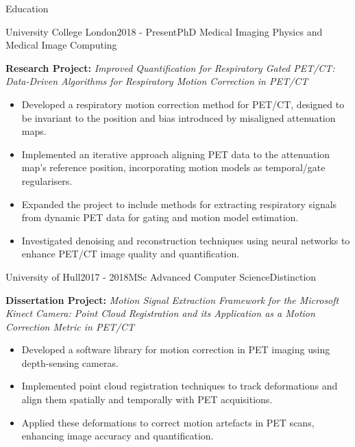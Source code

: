 \documentclass{cv}
\begin{document}
    \begin{rSection}{Education}
        \item \begin{rSubsection}{University College London}{2018 - Present}{PhD Medical Imaging Physics and Medical Image Computing}{}            
            \item \textbf{Research Project:} \textit{Improved Quantification for Respiratory Gated PET/CT: Data-Driven Algorithms for Respiratory Motion Correction in PET/CT}
            
            \item \begin{itemize}
                \item Developed a respiratory motion correction method for PET/CT, designed to be invariant to the position and bias introduced by misaligned attenuation maps.
                \item Implemented an iterative approach aligning PET data to the attenuation map’s reference position, incorporating motion models as temporal/gate regularisers.
                \item Expanded the project to include methods for extracting respiratory signals from dynamic PET data for gating and motion model estimation.
                \item Investigated denoising and reconstruction techniques using neural networks to enhance PET/CT image quality and quantification.
            \end{itemize}
        \end{rSubsection}
        
        \item \begin{rSubsection}{University of Hull}{2017 - 2018}{MSc Advanced Computer Science}{Distinction}
            \item \textbf{Dissertation Project:} \textit{Motion Signal Extraction Framework for the Microsoft Kinect Camera: Point Cloud Registration and its Application as a Motion Correction Metric in PET/CT}
            
            \item \begin{itemize}
                \item Developed a software library for motion correction in PET imaging using depth-sensing cameras.
                \item Implemented point cloud registration techniques to track deformations and align them spatially and temporally with PET acquisitions.
                \item Applied these deformations to correct motion artefacts in PET scans, enhancing image accuracy and quantification.
            \end{itemize}
        \end{rSubsection}
        

\end{rSection}
\end{document}
